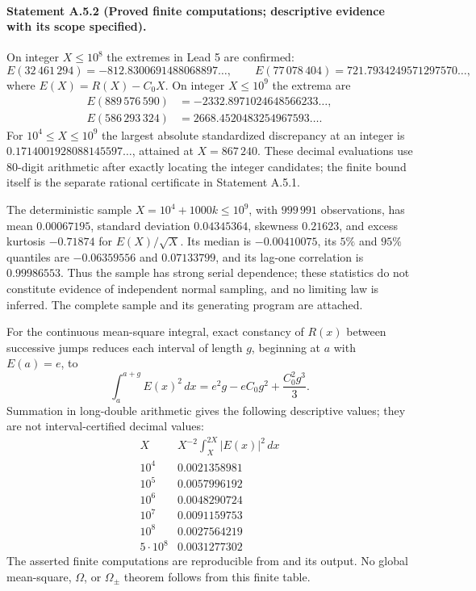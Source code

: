 \paragraph{Statement A.5.2 (Proved finite computations; descriptive evidence with its scope specified).}
On integer $X\leq10^8$ the extremes in Lead 5 are confirmed:
\[
 E(32\,461\,294)=-812.8300691488068897\ldots,
 \qquad E(77\,078\,404)=721.7934249571297570\ldots,
\]
where $E(X)=R(X)-C_0X$. On integer $X\leq10^9$ the extrema are
\[
 \begin{split}
 E(889\,576\,590)&=-2332.8971024648566233\ldots,\\
 E(586\,293\,324)&= 2668.4520483254967593\ldots.
 \end{split}
\]
For $10^4\leq X\leq10^9$ the largest absolute standardized discrepancy
at an integer is $0.1714001928088145597\ldots$, attained at
$X=867\,240$. These decimal evaluations use 80-digit arithmetic after
exactly locating the integer candidates; the finite bound itself is the
separate rational certificate in Statement A.5.1.

The deterministic sample $X=10^4+1000k\leq10^9$, with $999\,991$
observations, has mean $0.00067195$, standard deviation $0.04345364$,
skewness $0.21623$, and excess kurtosis $-0.71874$ for $E(X)/\sqrt X$.
Its median is $-0.00410075$, its $5\%$ and $95\%$ quantiles are
$-0.06359556$ and $0.07133799$, and its lag-one correlation is
$0.99986553$. Thus the sample has strong serial dependence; these
statistics do not constitute evidence of independent normal sampling,
and no limiting law is inferred.
The complete sample and its generating program are attached.

For the continuous mean-square integral, exact constancy of $R(x)$
between successive jumps reduces each interval of length $g$, beginning
at $a$ with $E(a)=e$, to
\[
 \int_a^{a+g}E(x)^2\,dx=e^2g-eC_0g^2+\frac{C_0^2g^3}{3}.
\]
Summation in long-double arithmetic gives the following descriptive
values; they are not interval-certified decimal values:
\[
\begin{array}{c|c}
 X&X^{-2}\int_X^{2X}|E(x)|^2\,dx\\\hline
 10^4&0.0021358981\\
 10^5&0.0057996192\\
 10^6&0.0048290724\\
 10^7&0.0091159753\\
 10^8&0.0027564219\\
 5\cdot10^8&0.0031277302
\end{array}
\]
The asserted finite computations are reproducible from
 and its output. No global mean-square,
$\Omega$, or $\Omega_\pm$ theorem follows from this finite table.

